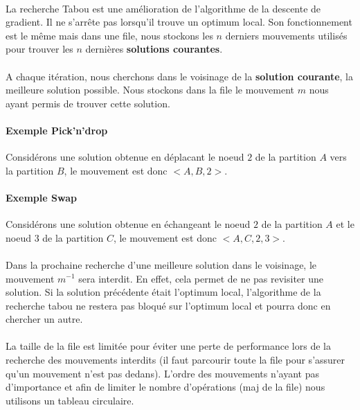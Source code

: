 \documentclass[12pt]{article}
\begin{document}
\paragraph{}La recherche Tabou est une amélioration de l'algorithme de la descente de gradient. Il ne s'arrête pas lorsqu'il trouve un optimum local.
Son fonctionnement est le même mais dans une file, nous stockons les $n$ derniers mouvements utilisés pour trouver les $n$ dernières \textbf{solutions courantes}.

\paragraph{}A chaque itération, nous cherchons dans le voisinage de la \textbf{solution courante}, la meilleure solution possible.
Nous stockons dans la file le mouvement $m$ nous ayant permis de trouver cette solution.

\paragraph{Exemple Pick'n'drop} Considérons une solution obtenue en déplacant le noeud $2$ de la partition $A$ vers la partition $B$, le mouvement est donc $<A,B,2>$.

\paragraph{Exemple Swap} Considérons une solution obtenue en échangeant le noeud $2$ de la partition $A$ et le noeud $3$ de la partition $C$, le mouvement est donc $<A,C,2,3>$.

\paragraph{}Dans la prochaine recherche d'une meilleure solution dans le voisinage, le mouvement $m^{-1}$ sera interdit.
En effet, cela permet de ne pas revisiter une solution.
Si la solution précédente était l'optimum local, l'algorithme de la recherche tabou ne restera pas bloqué sur l'optimum local et pourra donc en chercher un autre.


\paragraph{}La taille de la file est limitée pour éviter une perte de performance lors de la recherche des mouvements interdits (il faut parcourir toute la file pour s'assurer qu'un mouvement n'est pas dedans).
L'ordre des mouvements n'ayant pas d'importance et afin de limiter le nombre d'opérations (maj de la file) nous utilisons un tableau circulaire.
\end{document}
